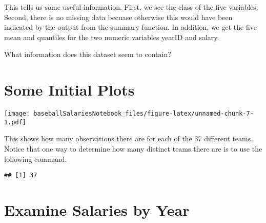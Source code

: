 \documentclass[]{article}
\newenvironment{Shaded}{\begin{snugshade}}{\end{snugshade}}
\newcommand{\KeywordTok}[1]{\textcolor[rgb]{0.13,0.29,0.53}{\textbf{#1}}}
\newcommand{\DataTypeTok}[1]{\textcolor[rgb]{0.13,0.29,0.53}{#1}}
\newcommand{\StringTok}[1]{\textcolor[rgb]{0.31,0.60,0.02}{#1}}
\newcommand{\OperatorTok}[1]{\textcolor[rgb]{0.81,0.36,0.00}{\textbf{#1}}}
\newcommand{\NormalTok}[1]{#1}
\begin{document}
This tells us some useful information. First, we see the class of the
five variables. Second, there is no missing data becuase otherwise this
would have been indicated by the output from the summary function. In
addition, we get the five mean and quantiles for the two numeric
variables yearID and salary.

What information does this dataset seem to contain?

\section{Some Initial Plots}\label{some-initial-plots}

\begin{Shaded}
\end{Shaded}

\texttt{[image: baseballSalariesNotebook\_files/figure-latex/unnamed-chunk-7-1.pdf]}

This shows how many observations there are for each of the 37 different
teams. Notice that one way to determine how many distinct teams there
are is to use the following command.

\begin{Shaded}
\end{Shaded}

\begin{verbatim}
## [1] 37
\end{verbatim}

\section{Examine Salaries by Year}\label{examine-salaries-by-year}

\begin{Shaded}
\end{Shaded}
\end{document}
